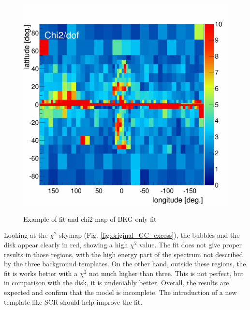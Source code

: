 \begin{figure}[h]
\begin{minipage}[h]{0.45\textwidth}
	  \includegraphics[width=1.\linewidth]{pic/results/chi2_distribution_BKGonly.png}
	  \label{fig:MKGonly_chi2Distribution}
  \end{minipage}
  \caption{Example of fit and chi2 map of BKG only fit}
  \label{}	 
\end{figure}


Looking at the $\chi^2$ skymap (Fig. \ref{fig:original_GC_excess}), the bubbles and the disk appear clearly in red, showing a high $\chi^2$ value. The fit does not give proper results in those regions, with the high energy part of the spectrum not described by the three background templates. On the other hand, outside these regions, the fit is works better with a $\chi^2$ not much higher than three. This is not perfect, but in comparison with the disk, it is undeniably better.
Overall, the results are expected and confirm that the model is incomplete. The introduction of a new template like SCR should help improve the fit.





